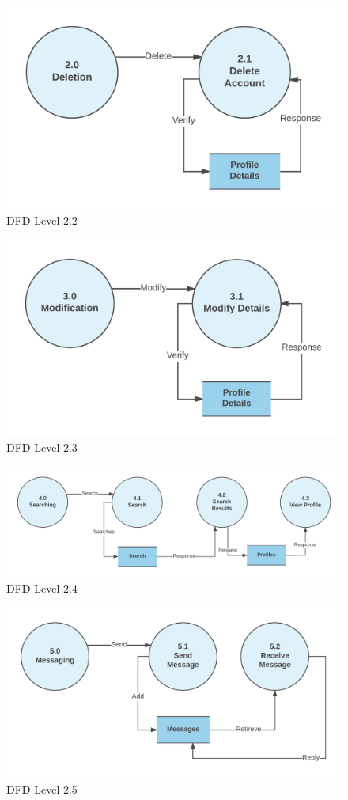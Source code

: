 \documentclass[12pt]{report}
\begin{document}
\begin{figure}[!htb]
    \centering
    \includegraphics[width=.8\textwidth]{df-l2-2.png}
    \caption{DFD Level 2.2}
    \label{fig:dfd l2.2}
\end{figure}

\begin{figure}[!htb]
    \centering
    \includegraphics[width=.8\textwidth]{df-l2-3.png}
    \caption{DFD Level 2.3}
    \label{fig:dfd l2.3}
\end{figure}

\begin{figure}[!htb]
    \centering
    \includegraphics[width=.8\textwidth]{df-l2-4.png}
    \caption{DFD Level 2.4}
    \label{fig:dfd l2.4}
\end{figure}

\begin{figure}[!htb]
    \centering
    \includegraphics[width=.8\textwidth]{df-l2-5.png}
    \caption{DFD Level 2.5}
    \label{fig:dfd l2.5}
\end{figure}
\end{document}
